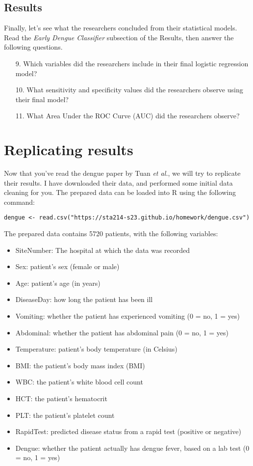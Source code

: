 \documentclass[11pt]{article}
\begin{document}
\subsection*{Results}

Finally, let's see what the researchers concluded from their statistical models. Read the \textit{Early Dengue Classifier} subsection of the Results, then answer the following questions.

\begin{enumerate}
    \item[9.] Which variables did the researchers include in their final logistic regression model?
    
    \item[10.] What sensitivity and specificity values did the researchers observe using their final model?
    
    \item[11.] What Area Under the ROC Curve (AUC) did the researchers observe?
\end{enumerate}

\section{Replicating results}

Now that you've read the dengue paper by Tuan \textit{et al.}, we will try to replicate their results. I have downloaded their data, and performed some initial data cleaning for you. The prepared data can be loaded into R using the following command:

\begin{verbatim}
dengue <- read.csv("https://sta214-s23.github.io/homework/dengue.csv")
\end{verbatim}

The prepared data contains 5720 patients, with the following variables:

\begin{itemize}
\item SiteNumber: The hospital at which the data was recorded 
\item Sex: patient's sex (female or male)
\item Age: patient's age (in years)
\item DiseaseDay: how long the patient has been ill
\item Vomiting: whether the patient has experienced vomiting (0 = no, 1 = yes)
\item Abdominal: whether the patient has abdominal pain (0 = no, 1 = yes)
\item Temperature: patient's body temperature (in Celsius)
\item BMI: the patient's body mass index (BMI)
\item WBC: the patient's white blood cell count
\item HCT: the patient's hematocrit
\item PLT: the patient's platelet count
\item RapidTest: predicted disease status from a rapid test (positive or negative)
\item Dengue: whether the patient actually has dengue fever, based on a lab test (0 = no, 1 = yes)
\end{itemize}
\end{document}
